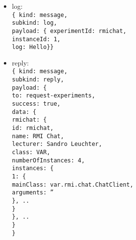 \begin{itemize}
  \item log:
    \\\texttt{\{ kind: message, \\subkind: log,
    \\ payload: \{ experimentId: rmichat, \\\hspace*{1.8cm}instanceId: 1, \\\hspace*{1.8cm}log: Hello\}\}}
  \item reply:
    \\\texttt{\{ kind: message, \\subkind: reply,
      \\ payload: \{ \\\hspace*{0.8cm}to: request-experiments, \\\hspace*{0.8cm}success: true, \\\hspace*{0.8cm}data: \{ \\\hspace*{1.6cm}rmichat: \{ \\\hspace*{2.4cm}id: rmichat, \\\hspace*{2.4cm}name: RMI Chat, \\\hspace*{2.4cm}lecturer: Sandro Leuchter, \\\hspace*{2.4cm}class: VAR, \\\hspace*{2.4cm}numberOfInstances: 4, \\\hspace*{2.4cm}instances: \{ \\\hspace*{3.2cm}1: \{ \\\hspace*{4cm}mainClass: var.rmi.chat.ChatClient, \\\hspace*{4cm}arguments: '' \\\hspace*{3.2cm}\}, .. \\\hspace*{2.4cm}\}\\\hspace*{1.6cm}\}, ..\\\hspace*{0.8cm}\}\\\}}
\end{itemize}
\clearpage

